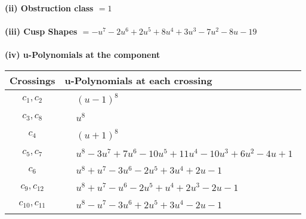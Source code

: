 \documentclass[1p]{elsarticle_modified}
\theoremstyle{definition}
\begin{document}
\flushleft \textbf{(ii) Obstruction class $= 1$}\\~\\
\flushleft \textbf{(iii) Cusp Shapes $= - u^7-2 u^6+2 u^5+8 u^4+3 u^3-7 u^2-8 u-19$}\\~\\
\newpage\renewcommand{\arraystretch}{1}
\flushleft \textbf{(iv) u-Polynomials at the component}\newline \\
\begin{tabular}{m{50pt}|m{274pt}}
Crossings & \hspace{64pt}u-Polynomials at each crossing \\
\hline $$\begin{aligned}c_{1},c_{2}\end{aligned}$$&$\begin{aligned}
&(u-1)^8
\end{aligned}$\\
\hline $$\begin{aligned}c_{3},c_{8}\end{aligned}$$&$\begin{aligned}
&u^8
\end{aligned}$\\
\hline $$\begin{aligned}c_{4}\end{aligned}$$&$\begin{aligned}
&(u+1)^8
\end{aligned}$\\
\hline $$\begin{aligned}c_{5},c_{7}\end{aligned}$$&$\begin{aligned}
&u^8-3 u^7+7 u^6-10 u^5+11 u^4-10 u^3+6 u^2-4 u+1
\end{aligned}$\\
\hline $$\begin{aligned}c_{6}\end{aligned}$$&$\begin{aligned}
&u^8+u^7-3 u^6-2 u^5+3 u^4+2 u-1
\end{aligned}$\\
\hline $$\begin{aligned}c_{9},c_{12}\end{aligned}$$&$\begin{aligned}
&u^8+u^7- u^6-2 u^5+u^4+2 u^3-2 u-1
\end{aligned}$\\
\hline $$\begin{aligned}c_{10},c_{11}\end{aligned}$$&$\begin{aligned}
&u^8- u^7-3 u^6+2 u^5+3 u^4-2 u-1
\end{aligned}$\\
\hline
\end{tabular}\\~\\
\end{document}
